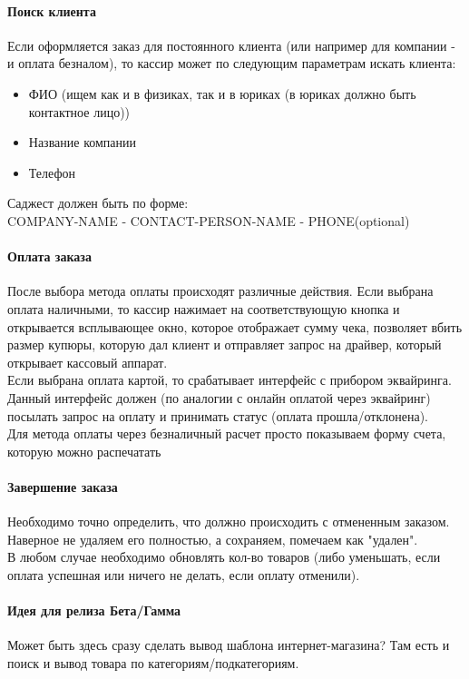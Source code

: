 \documentclass[DIV=calc, paper=a4, fontsize=11pt]{scrartcl} %
\begin{document}
\paragraph{Поиск клиента}
Если оформляется заказ для постоянного клиента (или например для компании - и оплата безналом), то кассир может по следующим параметрам искать клиента:

\begin{itemize}
	\item ФИО (ищем как и в физиках, так и в юриках (в юриках должно быть контактное лицо))
	\item Название компании
	\item Телефон
\end{itemize}

Саджест должен быть по форме:
\\COMPANY-NAME - CONTACT-PERSON-NAME - PHONE(optional)

\paragraph{Оплата заказа}
После выбора метода оплаты происходят различные действия. Если выбрана оплата наличными, то кассир нажимает на соответствующую кнопка и открывается всплывающее окно, которое отображает сумму чека, позволяет вбить размер купюры, которую дал клиент и отправляет запрос на драйвер, который открывает кассовый аппарат.
\\[0.5cm]
Если выбрана оплата картой, то срабатывает интерфейс с прибором эквайринга. Данный интерфейс должен (по аналогии с онлайн оплатой через эквайринг) посылать запрос на оплату и принимать статус (оплата прошла/отклонена).
\\[0.5cm]
Для метода оплаты через безналичный расчет просто показываем форму счета, которую можно распечатать 

\paragraph{Завершение заказа}
Необходимо точно определить, что должно происходить с отмененным заказом. Наверное не удаляем его полностью, а сохраняем, помечаем как "удален".
\\[0.5cm]
В любом случае необходимо обновлять кол-во товаров (либо уменьшать, если оплата успешная или ничего не делать, если оплату отменили).



\paragraph{Идея для релиза Бета/Гамма}
Может быть здесь сразу сделать вывод шаблона интернет-магазина? Там есть и поиск и вывод товара по категориям/подкатегориям.
\end{document}
